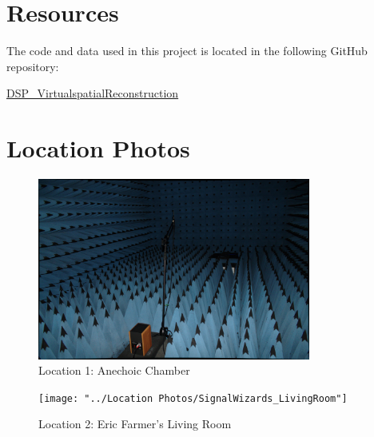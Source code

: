 \documentclass[letterpaper, 11pt, onecolumn, oneside]{article}
\begin{document}
\clearpage
\begin{appendix}
\section{Resources}
\label{appendix:resources}
The code and data used in this project is located in the following GitHub repository:

\href{https://github.com/WhoFama24/DSP_VirtualspatialReconstruction}{DSP\_VirtualspatialReconstruction}

\section{Location Photos}
\label{appendix:locationPhotos}
\begin{figure}[h!t]
    \includegraphics[width=0.8\textwidth]{"../Location Photos/SignalWizards_AnechoicChamber"}
    \centering
    \caption{Location 1: Anechoic Chamber}
\end{figure}

\begin{figure}[h!t]
    \texttt{[image: "../Location Photos/SignalWizards\_LivingRoom"]}
    \centering
    \caption{Location 2: Eric Farmer's Living Room}
\end{figure}


\end{appendix}
\end{document}

